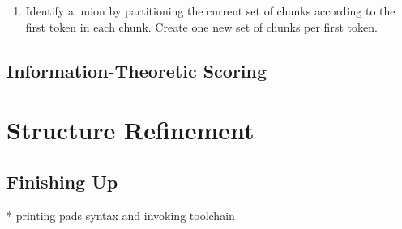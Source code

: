 \begin {enumerate}
\item Identify a union by partitioning the current set of chunks according
to the first token in each chunk.  Create one new set of chunks per first 
token.
\end{enumerate}


\subsection {Information-Theoretic Scoring}



\section {Structure Refinement}

%


 

\subsection {Finishing Up}

    * printing pads syntax and invoking toolchain
